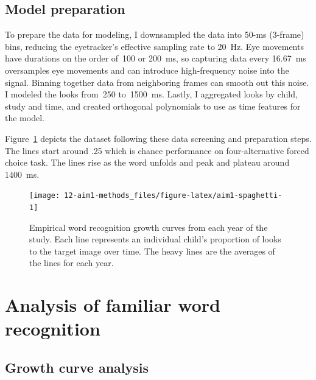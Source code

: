 \documentclass [11pt, proquest] {uwthesis}[2015/03/03]
\begin{document}
\section{Model preparation}\label{model-preparation}

To prepare the data for modeling, I downsampled the data into 50-ms
(3-frame) bins, reducing the eyetracker's effective sampling rate to
20~Hz. Eye movements have durations on the order of~100 or 200~ms, so
capturing data every 16.67~ms oversamples eye movements and can
introduce high-frequency noise into the signal. Binning together data
from neighboring frames can smooth out this noise. I modeled the looks
from~250 to~1500~ms. Lastly, I aggregated looks by child, study and
time, and created orthogonal polynomials to use as time features for the
model.

Figure~\ref{fig:aim1-spaghetti} depicts the dataset following these data
screening and preparation steps. The lines start around .25 which is
chance performance on four-alternative forced choice task. The lines
rise as the word unfolds and peak and plateau around 1400~ms.





\begin{figure}
\texttt{[image: 12-aim1-methods\_files/figure-latex/aim1-spaghetti-1]} \caption{Empirical word recognition growth curves from each
year of the study. Each line represents an individual child's proportion
of looks to the target image over time. The heavy lines are the averages
of the lines for each year.}\label{fig:aim1-spaghetti}
\end{figure}
\chapter{Analysis of familiar word
recognition}\label{analysis-of-familiar-word-recognition}

\section{Growth curve analysis}\label{growth-curve-analysis}
\end{document}
